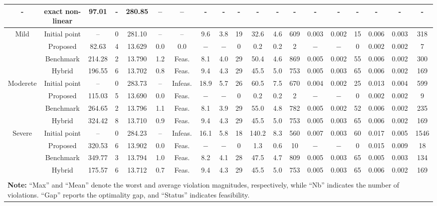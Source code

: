 \begin{table}[th!]
{\begin{tabular}{ccccccccccccccccccc}
    - & exact non-linear & 97.01 & - & 280.85 & -- & -- & - & - & - & - & - & - & - & - & - & - & - & - \\
    \midrule
       \rowcolor{lightgray} Mild & Initial point  & --   & 0 & 281.10 & -- & -- & 9.6 & 3.8 & 19 & 32.6 & 4.6 & 609 & 0.003 & 0.002  & 15 & 0.006 & 0.003  & 318 \\
      & Proposed & 82.63 & 4 & 13.629 & 0.0 & 0.0 & $ -$ & $-$ & 0   & 0.2 & 0.2  & 2    & $ -$ & $ -$ & 0  & 0.002 & 0.002  & 7 \\ 
      & Benchmark & 214.28 & 2 & 13.790 & 1.2 & Feas. & 8.1 & 4.0  & 29 & 50.4  & 4.6 & 869 & 0.005 & 0.002 & 55 & 0.006 & 0.002 & 300 \\
      & Hybrid & 196.55 & 6 & 13.702 & 0.8 & Feas. & 9.4 & 4.3 & 29 & 45.5 & 5.0 & 753 & 0.005 & 0.003 & 65 & 0.006 & 0.002 & 169\\
    \midrule
    \rowcolor{lightgray} Moderete & Initial point  & --  & 0 & 283.73 & -- & Infeas. & 18.9 & 5.7 & 26 & 60.5 & 7.5 & 670 & 0.004 & 0.002 & 25 & 0.013 &  0.004 & 599    \\ 
      & Proposed & 115.03  & 5 & 13.690  & 0.0 & Feas. & $ -$ & $ -$ & 0   & 0.2 & 0.2 & 2  & $ -$ & $ -$ & 0   & 0.002 & 0.002 & 9   \\ 
      & Benchmark & 264.65 & 2 & 13.796 & 1.1 & Feas. & 8.1 & 3.9  & 29 & 55.0  & 4.8 & 782 & 0.005 & 0.002 & 52 & 0.006 & 0.002 & 235 \\ 
      & Hybrid & 324.42 & 8 & 13.710 & 0.9 & Feas. & 9.4 & 4.3 & 29 & 45.5 & 5.0 & 753 & 0.005 & 0.003 & 65 & 0.006 & 0.002 & 169\\
    \midrule
    \rowcolor{lightgray} Severe & Initial point  & -- & 0 & 284.23 & -- & Infeas. & 16.1 & 5.8 & 18 & 140.2 & 8.3 & 560 & 0.007 & 0.003 & 60 & 0.017 & 0.005 & 1546   \\ 
      & Proposed & 320.53 & 6 & 13.902 & 0.0 & Feas. & $ -$ & $ -$ & 0 & 1.3 & 0.6 & 10 & $ -$ & $ -$ & 0 & 0.015 & 0.009 & 18 \\ 
      & Benchmark & 349.77 & 3 & 13.794 & 1.0 & Feas. & 8.2 & 4.1 & 28 & 47.5 & 4.7 & 809 & 0.005 & 0.003 & 65 & 0.005 & 0.003 & 134\\ 
      & Hybrid & 175.57 & 6 & 13.712 & 0.7 & Feas. & 9.4 & 4.3 & 29 & 45.5 & 5.0 & 753 & 0.005 & 0.003 & 65 & 0.006 & 0.002 & 169\\
    \bottomrule
    \\[0.5mm]
    \multicolumn{19}{l}{\footnotesize{\textbf{Note:} “Max” and “Mean” denote the worst and average violation magnitudes, respectively, while “Nb” indicates the number of violations. “Gap” reports the optimality gap, and “Status” indicates feasibility.}}
    \end{tabular}
}
\label{tab:comparison}
\end{table}